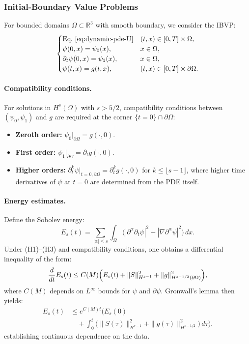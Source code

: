 \subsubsection{Initial-Boundary Value Problems}

For bounded domains $\Omega \subset \mathbb{R}^3$ with smooth boundary, we 
consider the IBVP:
\begin{equation}\label{eq:ibvp-U}
\begin{cases}
\text{Eq.~\eqref{eq:dynamic-pde-U}} & (t,x) \in [0,T] \times \Omega, \\
\psi(0,x) = \psi_0(x), & x \in \Omega, \\
\partial_t\psi(0,x) = \psi_1(x), & x \in \Omega, \\
\psi(t,x) = g(t,x), & (t,x) \in [0,T] \times \partial\Omega.
\end{cases}
\end{equation}

\paragraph{Compatibility conditions.}
For solutions in $H^s(\Omega)$ with $s > 5/2$, compatibility conditions 
between $(\psi_0, \psi_1)$ and $g$ are required at the corner 
$\{t=0\} \cap \partial\Omega$:
\begin{itemize}
\item \textbf{Zeroth order:} $\psi_0|_{\partial\Omega} = g(\cdot, 0)$.
\item \textbf{First order:} $\psi_1|_{\partial\Omega} = \partial_t g(\cdot, 0)$.
\item \textbf{Higher orders:} $\partial_t^k\psi|_{t=0,\partial\Omega} = \partial_t^k g(\cdot, 0)$ 
for $k \leq \lfloor s - 1 \rfloor$, where higher time derivatives of $\psi$ at 
$t=0$ are determined from the PDE itself.
\end{itemize}

\paragraph{Energy estimates.}
Define the Sobolev energy:
\begin{equation}
E_s(t) = \sum_{|\alpha| \leq s} \int_\Omega \bigl(|\partial^\alpha\partial_t\psi|^2 
+ |\nabla\partial^\alpha\psi|^2\bigr)\,dx.
\end{equation}
Under (H1)--(H3) and compatibility conditions, one obtains a differential 
inequality of the form:
\begin{equation}
\frac{d}{dt}E_s(t) \leq C(M)\Bigl(E_s(t) + \|S\|_{H^{s-1}}^2 + \|g\|_{H^{s-1/2}(\partial\Omega)}^2\Bigr),
\end{equation}
where $C(M)$ depends on $L^\infty$ bounds for $\psi$ and $\partial\psi$. 
Gronwall's lemma then yields:
\begin{align}
E_s(t) &\leq e^{C(M)t}\biggl(E_s(0) \nonumber\\
&\quad + \int_0^t \bigl(\|S(\tau)\|_{H^{s-1}}^2 + \|g(\tau)\|_{H^{s-1/2}}^2\bigr)\,d\tau\biggr).
\end{align}
establishing continuous dependence on the data.

